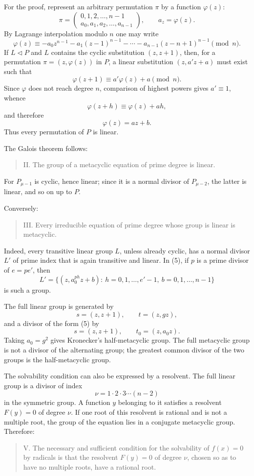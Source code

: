 \documentclass[11pt]{article}
\providecommand{\perm}[2]{\begin{pmatrix}#1\\#2\end{pmatrix}}
\begin{document}
For the proof, represent an arbitrary permutation $\pi$ by a function $\varphi(z)$:
\[
 \pi=\perm{0,1,2,\ldots,n-1}{a_0,a_1,a_2,\ldots,a_{n-1}},
 \qquad a_z=\varphi(z).
\]
By Lagrange interpolation modulo $n$ one may write
\[
  \varphi(z)\equiv -a_0 z^{n-1}-a_1(z-1)^{n-1}-\cdots-a_{n-1}(z-n+1)^{n-1}\pmod n. \tag{6}
\]
If $L\triangleleft P$ and $L$ contains the cyclic substitution $(z,z+1)$, then, for a permutation $\pi=(z,\varphi(z))$ in $P$, a linear substitution $(z,a'z+a)$ must exist such that
\[
  \varphi(z+1)\equiv a'\varphi(z)+a\pmod n.                     \tag{7}
\]
Since $\varphi$ does not reach degree $n$, comparison of highest powers gives $a'\equiv1$, whence
\[
  \varphi(z+h)\equiv \varphi(z)+ah,
\]
and therefore
\[
  \varphi(z)=az+b.                                               \tag{8}
\]
Thus every permutation of $P$ is linear.

The Galois theorem follows:
\begin{quote}
II. The group of a metacyclic equation of prime degree is linear.
\end{quote}
For $P_{\mu-1}$ is cyclic, hence linear; since it is a normal divisor of $P_{\mu-2}$, the latter is linear, and so on up to $P$.

Conversely:
\begin{quote}
III. Every irreducible equation of prime degree whose group is linear is metacyclic.
\end{quote}
Indeed, every transitive linear group $L$, unless already cyclic, has a normal divisor $L'$ of prime index that is again transitive and linear. In (5), if $p$ is a prime divisor of $e=pe'$, then
\[
  L'=\bigl\{(z,a_0^{ph}z+b):\ h=0,1,\ldots,e'-1,
       \ b=0,1,\ldots,n-1\bigr\}
\]
is such a group.

The full linear group is generated by
\[
  s=(z,z+1),\qquad t=(z,gz),                                      \tag{9}
\]
and a divisor of the form (5) by
\[
  s=(z,z+1),\qquad t_0=(z,a_0z).                                \tag{10}
\]
Taking $a_0=g^2$ gives Kronecker's half-metacyclic group. The full metacyclic group is not a divisor of the alternating group; the greatest common divisor of the two groups is the half-metacyclic group.

The solvability condition can also be expressed by a resolvent. The full linear group is a divisor of index
\[
  \nu=1\cdot2\cdot3\cdots(n-2)
\]
in the symmetric group. A function $y$ belonging to it satisfies a resolvent $F(y)=0$ of degree $\nu$. If one root of this resolvent is rational and is not a multiple root, the group of the equation lies in a conjugate metacyclic group. Therefore:
\begin{quote}
V. The necessary and sufficient condition for the solvability of $f(x)=0$ by radicals is that the resolvent $F(y)=0$ of degree $\nu$, chosen so as to have no multiple roots, have a rational root.
\end{quote}
\end{document}
